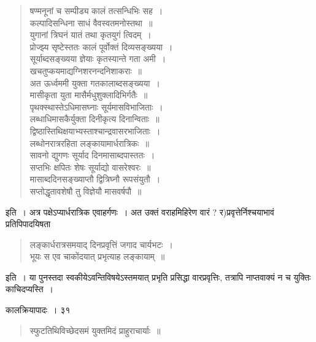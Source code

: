 \documentclass[11pt, openany]{book}
\begin{document}
{\begin{quote}
{\qt षण्मनूनां च सम्पीड्य कालं तत्सन्धिभिः सह~।\\
कल्पादिसन्धिना साधं वैवस्वतमनोस्तथा~॥\\
युगानां त्रिघनं यातं तथा कृतयुगं त्विदम्~।\\
प्रोज्झ्य सृष्टेस्ततः कालं पूर्वोक्तं दिव्यसङ्ख्यया~।\\
सूर्याब्दसङ्ख्यया ज्ञेयाः कृतस्यान्ते गता अमी~।\\
खचतुप्कयमाद्यग्निशरनन्दनिशाकराः~॥ \\
अत ऊर्ध्वममी युक्ता गतकालाब्दसङ्ख्यया~।\\
मासीकृता युता मासैर्मधुशुक्लादिभिर्गतैः~॥\\
पृथक्स्थास्तेऽधिमासघ्नाः सूर्यमासविभाजिताः~।\\
लब्धाधिमासकैर्युक्ता दिनीकृत्य दिनान्विताः~॥\\
द्विष्ठास्तिथिक्षयाभ्यस्ताश्चान्द्रवासरभाजिताः~।\\
लब्धोनरात्ररहिता लङ्कायामार्धरात्रिकः~॥\\
सावनो द्युगणः सूर्याद दिनमासाब्दपास्ततः~।\\
सप्तभिः क्षपितः शेषः सूर्याद्यो वासरेश्वरः~॥\\
मासाब्ददिनसङ्ख्याप्तौ द्वित्रिघ्नौ रूपसंयुतौ~।\\
सप्तोद्धृतावशेषौ तु विज्ञेयौ मासवर्षपौ~॥}
\end{quote}
\noindent इति~। अत्र पक्षेऽप्यार्धरात्रिक एवाहर्गणः~। अत उक्तं वराहमिहिरेण वारं ? र)प्रवृत्तेर्निश्चयाभावं प्रतिपिपादयिषता\textendash 

\begin{quote}
{\qt लङ्कार्धरात्रसमयाद् दिनप्रवृत्तिं जगाद चार्यभटः~।\\
भूयः स एव चाकोंदयात् प्रभृत्याह लङ्कायाम्~॥}
\end{quote}
\noindent इति~। या पुनस्तदा स्वकीयेऽवन्तिविषयेऽस्तमयात् प्रभृति प्रसिद्धा वारप्रवृत्तिः, तत्रापि नाप्तवाक्यं न च युक्तिः काचिदप्यस्ति~। 

\newpage

\vspace{3cm} \hspace{4cm}कालक्रियापादः~।\hspace{4cm} ३१

\vspace{0.3cm}
\begin{quote} 
{\qt स्फुटतिथिविच्छेदसमं युक्तमिदं प्राहुराचार्याः~॥}
\end{quote} 

}
\end{document}
